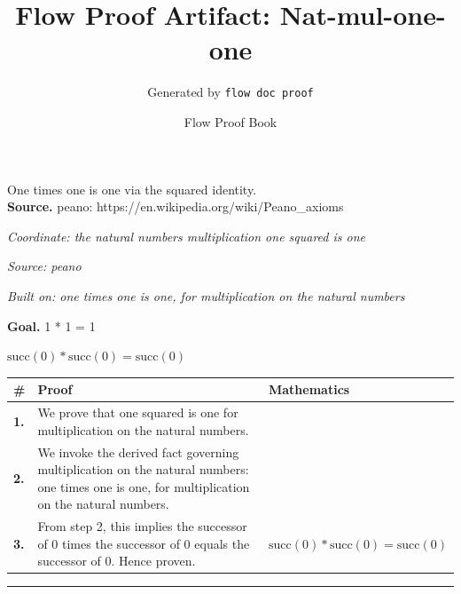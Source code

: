 \documentclass[11pt]{article}
\title{Flow Proof Artifact: Nat-mul-one-one}
\author{Generated by \texttt{flow doc proof}}
\date{Flow Proof Book}
\theoremstyle{definition}
\begin{document}
\maketitle
One times one is one via the squared identity.\\[0.5em]
\textbf{Source.} peano: https://en.wikipedia.org/wiki/Peano\_axioms\\[0.5em]
\bigskip
{}\par
\smallskip\noindent\textit{Coordinate: the natural numbers \cdot multiplication \cdot one squared is one}\par
\smallskip\noindent\textit{Source: peano}\par
\smallskip\noindent\textit{Built on: one times one is one, for multiplication on the natural numbers}\par
\medskip
\noindent\textbf{Goal.} 1 * 1 = 1\par
\noindent$\displaystyle \mathrm{succ}(0) * \mathrm{succ}(0) = \mathrm{succ}(0)$\par
\medskip
\noindent
\begin{tabular}{@{} >{\raggedright\arraybackslash}p{} >{\raggedright\arraybackslash}p{} >{\raggedleft\arraybackslash}p{} @{}}
\textbf{\#} & \textbf{Proof} & \textbf{Mathematics} \\
\midrule
\textbf{1.} & We prove that one squared is one for multiplication on the natural numbers. & \\[0.45em]
\textbf{2.} & We invoke the derived fact governing multiplication on the natural numbers: one times one is one, for multiplication on the natural numbers. & \\[0.45em]
\textbf{3.} & From step 2, this implies the successor of 0 times the successor of 0 equals the successor of 0. Hence proven. & $\displaystyle \mathrm{succ}(0) * \mathrm{succ}(0) = \mathrm{succ}(0)$ \\[0.45em]
\bottomrule
\end{tabular}
\label{thm:Nat-multiplication-one_squared_is_one}
\par\medskip\hrule
\end{document}

